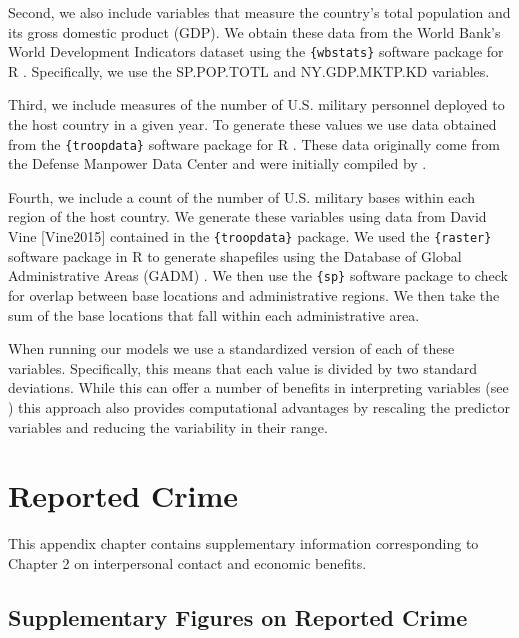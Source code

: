 \documentclass[
]{book}
\theoremstyle{definition}
\theoremstyle{definition}
\theoremstyle{definition}
\theoremstyle{definition}
\theoremstyle{remark}
\begin{document}
Second, we also include variables that measure the country's total population and its gross domestic product (GDP). We obtain these data from the World Bank's World Development Indicators dataset using the \texttt{\{wbstats\}} software package for R \citep{wdidata2021, piburn2020}. Specifically, we use the SP.POP.TOTL and NY.GDP.MKTP.KD variables.

Third, we include measures of the number of U.S. military personnel deployed to the host country in a given year. To generate these values we use data obtained from the \texttt{\{troopdata\}} software package for R \citep{allenflynnmartinezmachain2022}. These data originally come from the Defense Manpower Data Center and were initially compiled by \citet{Kane2004}.

Fourth, we include a count of the number of U.S. military bases within each region of the host country. We generate these variables using data from David Vine {[}Vine2015{]} contained in the \texttt{\{troopdata\}} package. We used the \texttt{\{raster\}} software package in R \citep{hijmans2022} to generate shapefiles using the Database of Global Administrative Areas (GADM) \citep{GADM2021}. We then use the \texttt{\{sp\}} software package to check for overlap between base locations and administrative regions. We then take the sum of the base locations that fall within each administrative area.

When running our models we use a standardized version of each of these variables. Specifically, this means that each value is divided by two standard deviations. While this can offer a number of benefits in interpreting variables (see \citet{Gelman2008}) this approach also provides computational advantages by rescaling the predictor variables and reducing the variability in their range.

\hypertarget{reported-crime}{%
\chapter{Reported Crime}\label{reported-crime}}

This appendix chapter contains supplementary information corresponding to Chapter 2 on interpersonal contact and economic benefits.

\hypertarget{supplementary-figures-on-reported-crime}{%
\section{Supplementary Figures on Reported Crime}\label{supplementary-figures-on-reported-crime}}
\end{document}
